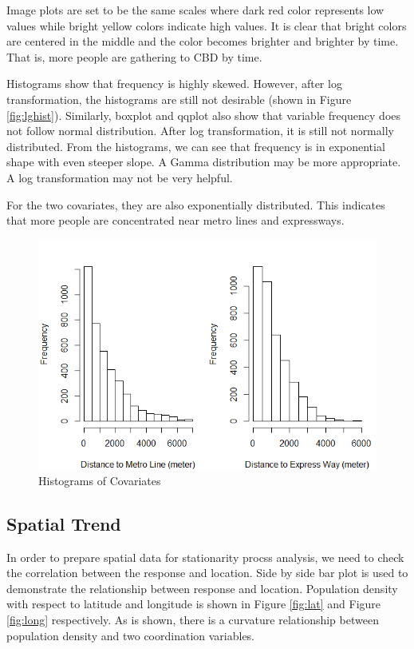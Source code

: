 \documentclass[hidelinks,12pt]{article}
\begin{document}
	Image plots are set to be the same scales where dark red color represents low values while bright yellow colors indicate high values. It is clear that bright colors are centered in the middle and the color becomes brighter and brighter by time. That is, more people are gathering to CBD by time.
	
	Histograms show that frequency is highly skewed. However, after log transformation, the histograms are still not desirable (shown in Figure \ref{fig:lghist}). Similarly, boxplot and qqplot also show that variable frequency does not follow normal distribution. After log transformation, it is still not normally distributed. From the histograms, we can see that frequency is in exponential shape with even steeper slope. A Gamma distribution may be more appropriate. A log transformation may not be very helpful.
	
	For the two covariates, they are also exponentially distributed. This indicates that more people are concentrated near metro lines and expressways.
	\begin{figure}[!ht]
		\includegraphics[width=\textwidth]{hist_x.png}
		\caption{Histograms of Covariates \label{fig:histx}}
	\end{figure}
\FloatBarrier

	\subsection{Spatial Trend}\label{sec:spatialtrend}
	
	In order to prepare spatial data for stationarity procss analysis, we need to check the correlation between the response and location. Side by side bar plot is used to demonstrate the relationship between response and location. Population density with respect to latitude and longitude is shown in Figure \ref{fig:lat} and Figure \ref{fig:long} respectively. As is shown, there is a curvature relationship between population density and two coordination variables. 
	
\end{document}
